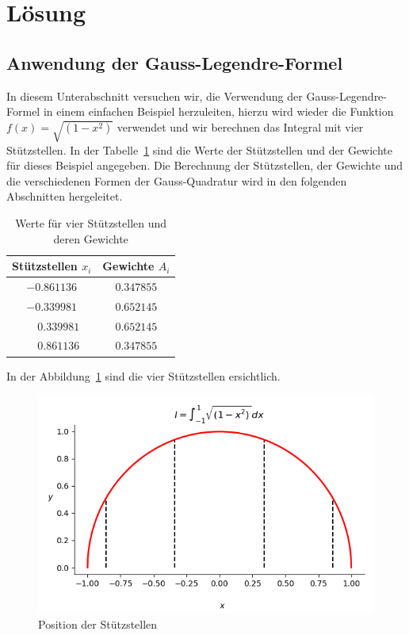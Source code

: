 %
%
%
\section{Lösung
\label{quadratur:section:loesung}}
\subsection{Anwendung der Gauss-Legendre-Formel
\label{quadratur:subsection:gausslegendreanwendung}}
In diesem Unterabschnitt versuchen wir, die Verwendung der Gauss-Legendre-Formel in einem
einfachen Beispiel herzuleiten, hierzu wird wieder die Funktion  
$f(x) = \sqrt{(1-x^2)}$ verwendet und 
wir berechnen das Integral mit vier Stützstellen.
In der Tabelle~\ref{buch:table:gaussbeispielwerte} sind die Werte der 
Stützstellen und der Gewichte für dieses Beispiel angegeben.
Die Berechnung der Stützstellen, der Gewichte
und die verschiedenen Formen der Gauss-Quadratur wird in den folgenden Abschnitten 
hergeleitet.
\begin{table}
    \centering
    \begin{tabular}{|c|c|}
        \hline
        Stützstellen $x_{i}$ & Gewichte $A_{i}$ \\
        \hline
        $-0.861136 $ & $ 0.347855 $ \\
        $-0.339981 $ & $ 0.652145 $ \\
        $\phantom{-} 0.339981 $ & $ 0.652145 $ \\
        $\phantom{-} 0.861136 $ & $ 0.347855 $ \\
        \hline
    \end{tabular}
    \caption{Werte für vier Stützstellen und deren Gewichte
    \label{buch:table:gaussbeispielwerte}}    
\end{table}
In der Abbildung~\ref{quadratur:figure:gausslegendre1} sind die vier Stützstellen 
ersichtlich.
\begin{figure}
    \centering
    \includegraphics[scale=0.7]{papers/quadratur/figures/GaussLegendre1.png}
    \caption{ Position der Stützstellen
    \label{quadratur:figure:gausslegendre1}}
\end{figure}
